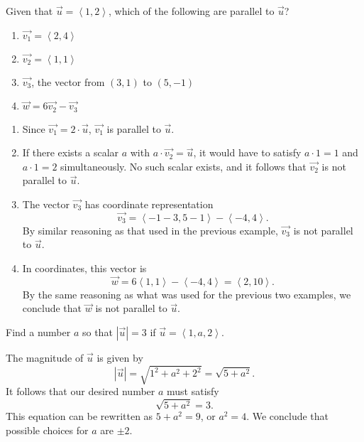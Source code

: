 \documentclass[handout,noauthor]{ximera}
\begin{document}
\begin{problem}
Given that $\vec{u} = \left<1,2\right>$, which of the following are parallel to $\vec{u}$?

\begin{enumerate}[label=(\alph*)]
\item $\vec{v_1}=\left<2,4\right>$
\item $\vec{v_2}=\left<1,1\right>$ 
\item $\vec{v_3}$, the vector from $(3,1)$ to $(5,-1)$
\item $\vec{w} = 6 \vec{v_2} - \vec{v_3}$
\end{enumerate}


\begin{freeResponse}
\begin{enumerate}[label=(\alph*)]
\item Since $\vec{v_1} = 2 \cdot \vec{u}$, $\vec{v_1}$ is parallel to $\vec{u}$. 
\item If there exists a scalar $a$ with $a \cdot \vec{v_2} = \vec{u}$, it would have to satisfy $a \cdot 1 = 1$ and $a \cdot 1 = 2$ simultaneously. No such scalar exists, and it follows that $\vec{v_2}$ is not parallel to $\vec{u}$. 
\item The vector $\vec{v_3}$ has coordinate representation 
$$
\vec{v_3} = \left<-1 - 3, 5 - 1\right> - \left<-4, 4\right>.
$$
By similar reasoning as that used in the previous example, $\vec{v_3}$ is not parallel to $\vec{u}$.
\item In coordinates, this vector is 
$$
\vec{w} = 6 \left<1,1\right> - \left<-4,4\right> = \left<2,10\right>.
$$
By the same reasoning as what was used for the previous two examples, we conclude that $\vec{w}$ is not parallel to $\vec{u}$. 
\end{enumerate}
\end{freeResponse}
\end{problem}


\begin{problem}
Find a number $a$ so that $\left|\vec{u}\right| = 3$ if $\vec{u} = \left<1,a,2\right>$. 

\begin{freeResponse}
The magnitude of $\vec{u}$ is given by
$$
\left|\vec{u}\right| = \sqrt{1^2 + a^2 + 2^2} = \sqrt{5 + a^2}.
$$
It follows that our desired number $a$ must satisfy
$$
\sqrt{5 + a^2} = 3.
$$
This equation can be rewritten as $5 + a^2 = 9$, or $a^2 = 4$. We conclude that possible choices for $a$ are $\pm 2$. 
\end{freeResponse}
\end{problem}
\end{document}
